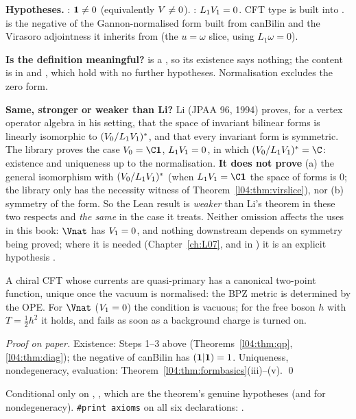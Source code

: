 \begin{dictionary}
\textbf{Hypotheses.} : $\mathbf{1}\ne0$ (equivalently $V\ne0$). : $L_1V_1 = 0$.
CFT type is built into .  is the negative of the
Gannon-normalised form  built from canBilin and the Virasoro adjointness it inherits from
 (the $u = \omega$ slice, using $L_1\omega = 0$).

\textbf{Is the definition meaningful?}  is a , so its existence
says nothing; the content is in \lean{_}\allowbreak{} and , which hold with no
further hypotheses. Normalisation excludes the zero form.

\textbf{Same, stronger or weaker than Li?} Li (JPAA 96, 1994) proves, for a vertex operator algebra
in his setting, that the space of invariant bilinear forms is linearly isomorphic to
$(V_0/L_1V_1)^*$, and that every invariant form is symmetric. The library proves the case
$\lfourV_0 = \C\lfourvac$, $L_1V_1 = 0$, in which $(\lfourV_0/L_1\lfourV_1)^* = \C$: existence and uniqueness up to
the normalisation. \textbf{It does not prove} (a) the general isomorphism with $(V_0/L_1V_1)^*$
(when $L_1\lfourV_1 = \C\lfourvac$ the space of forms is $0$; the library only has the necessity witness of
Theorem~\ref{l04:thm:virslice}), nor (b) symmetry of the form. So the Lean result is \emph{weaker} than
Li's theorem in these two respects and \emph{the same} in the case it treats. Neither omission affects
the uses in this book: $\Vnat$ has $V_1 = 0$, and nothing downstream depends on symmetry being
proved; where it is needed (Chapter~\ref{ch:L07},  and
 in ) it is an
explicit hypothesis .
\end{dictionary}
\begin{physics}
A chiral CFT whose currents are quasi-primary has a canonical two-point function, unique once the
vacuum is normalised: the BPZ metric is determined by the OPE. For $\Vnat$ ($V_1 = 0$) the condition is
vacuous; for the free boson $h$ with $T = \tfrac12h^2$ it holds, and fails as soon as a background charge
is turned on.
\end{physics}
\emph{Proof on paper.} Existence: Steps 1--3 above (Theorems~\ref{l04:thm:qp}, \ref{l04:thm:diag}); the
negative of canBilin has $(\mathbf{1}|\mathbf{1}) = 1$. Uniqueness, nondegeneracy, evaluation:
Theorem~\ref{l04:thm:formbasics}(iii)--(v). \qed
\begin{status}
Conditional only on , , which are the theorem's genuine hypotheses (and 
for nondegeneracy). \texttt{\#print axioms} on all six declarations: .
\end{status}

